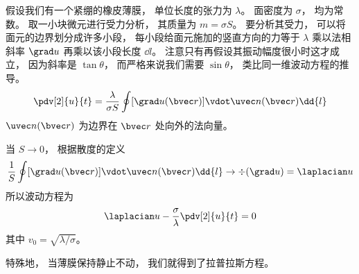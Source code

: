 
\begin{issues}
\issueDraft
\end{issues}


假设我们有一个紧绷的橡皮薄膜， 单位长度的张力为 $\lambda$。 面密度为 $\sigma$， 均为常数。 取一小块微元进行受力分析， 其质量为 $m = \sigma S$。 要分析其受力， 可以将面元的边界划分成许多小段， 每小段给面元施加的竖直方向的力等于 $\lambda$ 乘以法相斜率 $\grad u$ 再乘以该小段长度 $\dd{l}$。 注意只有再假设其振动幅度很小时这才成立， 因为斜率是 $\tan\theta$， 而严格来说我们需要 $\sin\theta$， 类比同一维波动方程的推导。
\begin{equation}
\pdv[2]{u}{t} = \frac{\lambda}{\sigma S}\oint [\grad u(\bvec r)] \vdot \uvec n(\bvec r) \dd{l}
\end{equation}
$\uvec n(\bvec r)$ 为边界在 $\bvec r$ 处向外的法向量。

当 $S \to 0$， 根据散度的定义
\begin{equation}
\frac{1}{S} \oint [\grad u(\bvec r)] \vdot \uvec n(\bvec r) \dd{l} \to \div (\grad u) = \laplacian u
\end{equation}
所以波动方程为
\begin{equation}
\laplacian u - \frac{\sigma}{\lambda}\pdv[2]{u}{t} = 0
\end{equation}
其中 $v_0 = \sqrt{\lambda/\sigma}$。

特殊地， 当薄膜保持静止不动， 我们就得到了拉普拉斯方程。
